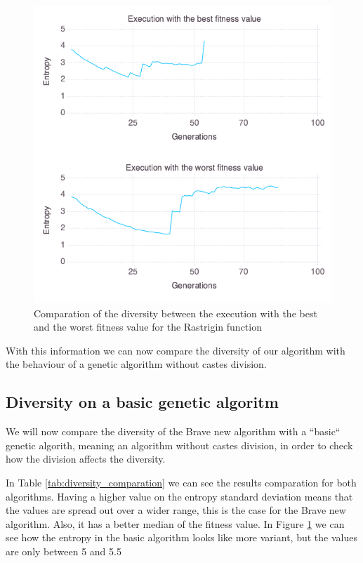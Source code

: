 \begin{figure}[]
	\centering	
	\includegraphics[scale=0.5]{./figures/config_file_10_Rastrigin_diversity_comparation.png}
	\caption{ Comparation of the diversity between the execution with the best and the worst fitness value for the Rastrigin function }
    \label{fig:rastrigin_diversity_comparation}
\end{figure}

With this information we can now compare the diversity of our algorithm with the behaviour of a genetic algorithm without
castes division.

\subsection{Diversity on a basic genetic algoritm}

We will now compare the diversity of the Brave new algorithm with a ``basic`` genetic algorith, meaning an algorithm without castes division, in order
to check how the division affects the diversity.

In Table \ref{tab:diversity_comparation} we can see the results comparation for both algorithms. Having a higher value on
the entropy standard deviation means that the values are spread out over a wider range, this is the case for the Brave
new algorithm. Also, it has a better median of the fitness value. In Figure \ref{fig:rastrigin_diversity_comparation} we can see
how the entropy in the basic algorithm looks like more variant, but the values are only between 5 and 5.5

